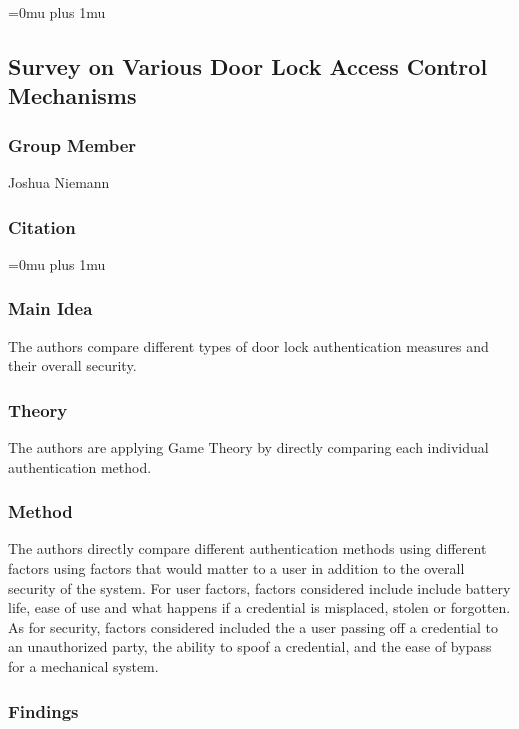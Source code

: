 \Urlmuskip=0mu plus 1mu\relax

\noindent
\subsection{{S}urvey on {V}arious {D}oor {L}ock {A}ccess {C}ontrol {M}echanisms}

\subsubsection{Group Member}

\noindent
Joshua Niemann

\noindent
\subsubsection{Citation}

\Urlmuskip=0mu plus 1mu\relax
{}

\subsubsection{Main Idea}

\noindent
The authors compare different types of door lock authentication measures and their overall security.

\subsubsection{Theory}

\noindent
The authors are applying Game Theory by directly comparing each individual authentication method.

\subsubsection{Method}

\noindent
The authors directly compare different authentication methods using different factors using factors that would matter to a user in addition to the overall security of the system.  For user factors, factors considered include include battery life, ease of use and what happens if a credential is misplaced, stolen or forgotten.  As for security, factors considered included the a user passing off a credential to an unauthorized party, the ability to spoof a credential, and the ease of bypass for a mechanical system.

\subsubsection{Findings}

